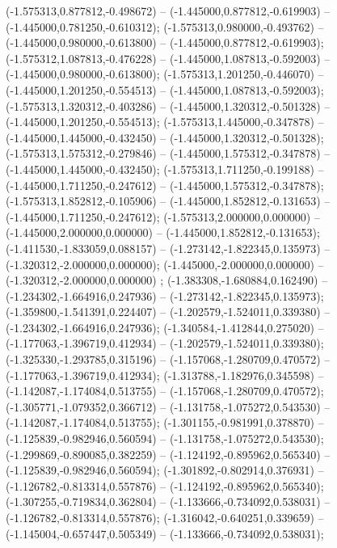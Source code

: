  (-1.575313,0.877812,-0.498672) -- (-1.445000,0.877812,-0.619903) -- (-1.445000,0.781250,-0.610312);
 (-1.575313,0.980000,-0.493762) -- (-1.445000,0.980000,-0.613800) -- (-1.445000,0.877812,-0.619903);
 (-1.575312,1.087813,-0.476228) -- (-1.445000,1.087813,-0.592003) -- (-1.445000,0.980000,-0.613800);
 (-1.575313,1.201250,-0.446070) -- (-1.445000,1.201250,-0.554513) -- (-1.445000,1.087813,-0.592003);
 (-1.575313,1.320312,-0.403286) -- (-1.445000,1.320312,-0.501328) -- (-1.445000,1.201250,-0.554513);
 (-1.575313,1.445000,-0.347878) -- (-1.445000,1.445000,-0.432450) -- (-1.445000,1.320312,-0.501328);
 (-1.575313,1.575312,-0.279846) -- (-1.445000,1.575312,-0.347878) -- (-1.445000,1.445000,-0.432450);
 (-1.575313,1.711250,-0.199188) -- (-1.445000,1.711250,-0.247612) -- (-1.445000,1.575312,-0.347878);
 (-1.575313,1.852812,-0.105906) -- (-1.445000,1.852812,-0.131653) -- (-1.445000,1.711250,-0.247612);
 (-1.575313,2.000000,0.000000) -- (-1.445000,2.000000,0.000000) -- (-1.445000,1.852812,-0.131653);
 (-1.411530,-1.833059,0.088157) -- (-1.273142,-1.822345,0.135973) -- (-1.320312,-2.000000,0.000000);
 (-1.445000,-2.000000,0.000000) -- (-1.320312,-2.000000,0.000000) ;
 (-1.383308,-1.680884,0.162490) -- (-1.234302,-1.664916,0.247936) -- (-1.273142,-1.822345,0.135973);
 (-1.359800,-1.541391,0.224407) -- (-1.202579,-1.524011,0.339380) -- (-1.234302,-1.664916,0.247936);
 (-1.340584,-1.412844,0.275020) -- (-1.177063,-1.396719,0.412934) -- (-1.202579,-1.524011,0.339380);
 (-1.325330,-1.293785,0.315196) -- (-1.157068,-1.280709,0.470572) -- (-1.177063,-1.396719,0.412934);
 (-1.313788,-1.182976,0.345598) -- (-1.142087,-1.174084,0.513755) -- (-1.157068,-1.280709,0.470572);
 (-1.305771,-1.079352,0.366712) -- (-1.131758,-1.075272,0.543530) -- (-1.142087,-1.174084,0.513755);
 (-1.301155,-0.981991,0.378870) -- (-1.125839,-0.982946,0.560594) -- (-1.131758,-1.075272,0.543530);
 (-1.299869,-0.890085,0.382259) -- (-1.124192,-0.895962,0.565340) -- (-1.125839,-0.982946,0.560594);
 (-1.301892,-0.802914,0.376931) -- (-1.126782,-0.813314,0.557876) -- (-1.124192,-0.895962,0.565340);
 (-1.307255,-0.719834,0.362804) -- (-1.133666,-0.734092,0.538031) -- (-1.126782,-0.813314,0.557876);
 (-1.316042,-0.640251,0.339659) -- (-1.145004,-0.657447,0.505349) -- (-1.133666,-0.734092,0.538031);
